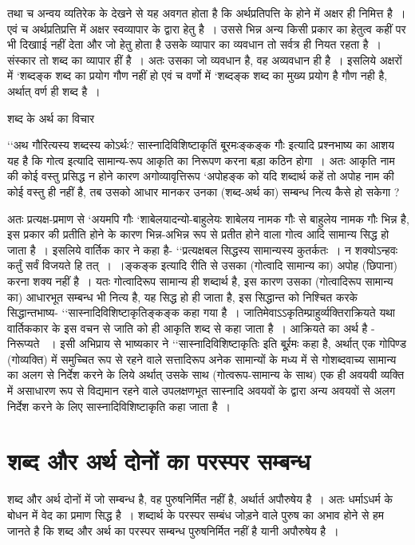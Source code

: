 {तथा च अन्वय व्यतिरेक के देखने से यह अवगत होता है कि अर्थप्रतिपत्ति के होने में अक्षर ही निमित्त है~। एवं च अर्थप्रतिप्रत्ति में अक्षर स्वव्यापार के द्वारा हेतु है~। उससे भिन्न अन्य किसी प्रकार का हेतुत्व कहीं पर भी दिखााई नहीं देता और जो हेतु होता है उसके व्यापार का व्यवधान तो सर्वत्र ही नियत रहता है~। संस्कार तो शब्द का व्यापार हीं है~। अतः उसका जो व्यवधान है, वह अव्यवधान ही है~। इसलिये अक्षरों में ‘शब्दङ्क शब्द का प्रयोग गौण नहीं हो एवं च वर्णो में ‘शब्दङ्क शब्द का मुख्य प्रयोग है गौण नही है, अर्थात्  वर्ण ही शब्द है~।   

शब्द के अर्थ का विचार

‘‘अथ गौरित्यस्य शब्दस्य कोऽर्थः? सास्नादिविशिष्टाकृतिं बू्रमःङ्कङ्क गौः इत्यादि प्रश्नभाष्य का आशय यह है कि गोत्व इत्यादि सामान्य-रूप आकृति का निरूपण करना बड़ा कठिन होगा~। अतः आकृति नाम की कोई वस्तु प्रसिद्ध न होने कारण अगोव्यावृत्तिरूप ‘अपोहङ्क को यदि शब्दार्थ कहें तो अपोह नाम की कोई वस्तु ही नहीं है, तब उसको आधार मानकर उनका (शब्द-अर्थ का) सम्बन्ध नित्य कैसे हो सकेगा ?

अतः प्रत्यक्ष-प्रमाण से ‘अयमपि गौः ‘शाबेलयादन्यो-बाहुलेयः शाबेलय नामक गौः से बाहुलेय नामक गौः भिन्न है, इस प्रकार की प्रतीति होने के कारण भिन्न-अभिन्न रूप से प्रतीत होने वाला गोत्व आदि सामान्य सिद्ध हो जाता है~। इसलिये वार्तिक कार ने कहा है- ‘‘प्रत्यक्षबल सिद्धस्य सामान्यस्य कुतर्कतः~। न शक्योऽन्हवः कर्तुं सर्वं विजयते हि तत्~।~।ङ्कङ्क इत्यादि रीति से उसका (गोत्वादि सामान्य का) अपोह (छिपाना) करना शक्य नहीं है~। यतः गोत्वादिरूप सामान्य ही शब्दार्थ है, इस कारण उसका (गोत्वादिरूप सामान्य का) आधारभूत सम्बन्ध भी नित्य है, यह सिद्ध हो ही जाता है, इस सिद्धान्त को निश्चित करके सिद्धान्तभाष्य- ‘‘सास्नादिविशिष्टाकृतिङ्कङ्क कहा गया है~। जातिमेवाऽऽकृतिम्प्राहुर्व्यक्तिराक्रियते यथा वार्तिककार के इस वचन से जाति को ही आकृति शब्द से कहा जाता है~। आक्रियते का अर्थ है - निरूप्यते ~। इसी अभिप्राय से भाष्यकार ने ‘‘सास्नादिविशिष्टाकृतिः इति बू्र्र्रमः कहा है, अर्थात् एक गोपिण्ड (गोव्यक्ति) में समुच्चित रूप से रहने वाले सत्तादिरूप अनेक सामान्यों के मध्य में से गोशब्दवाच्य सामान्य का अलग से निर्देश करने के लिये अर्थात् उसके साथ (गोत्वरूप-सामान्य के साथ) एक ही अवयवी व्यक्ति में असाधारण रूप से विद्यमान रहने वाले उपलक्षणभूत सास्नादि अवयवों के द्वारा अन्य अवयवों से अलग निर्देश करने के लिए सास्नादिविशिष्टाकृति कहा जाता है~।

\section*{शब्द और अर्थ दोनों का परस्पर सम्बन्ध}

शब्द और अर्थ दोनों में जो सम्बन्ध है, वह पुरुषनिर्मित नहीं है, अर्थार्त अपौरुषेय है~। अतः धर्माऽधर्म के बोधन में वेद का प्रमाण सिद्ध है~। शब्दार्थ के परस्पर सम्बंध जोड़ने वाले पुरुष का अभाव होने से हम जानते है कि शब्द और अर्थ का परस्पर सम्बन्ध पुरुषनिर्मित  नहीं है यानी अपौरुषेय है~।

}
